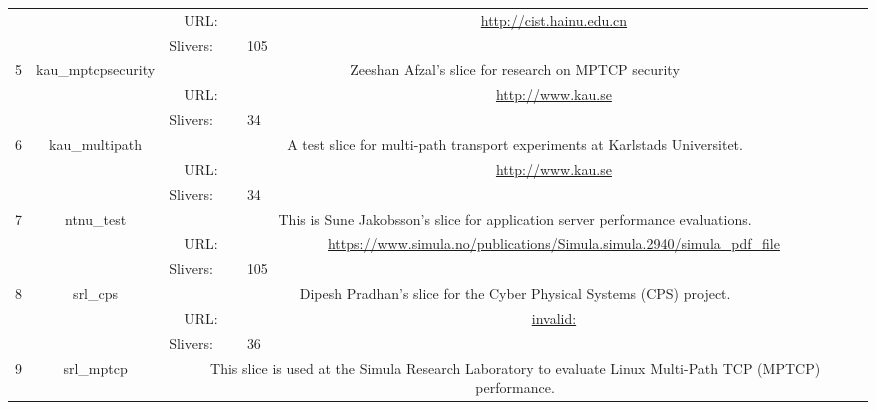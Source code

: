 \begin{small}
\begin{center}
\begin{longtable}{|c|c|c|c|}
  &  & \multicolumn{1}{|p{5em}|}{URL:} & \multicolumn{1}{|p{22.5em}|}{\url{http://cist.hainu.edu.cn}} \\* \cline{3-3}\cline{4-4}
  &  & \multicolumn{1}{|l|}{Slivers:} & \multicolumn{1}{|l|}{105} \\ \hline
 \multirow{3}{*}{5} & \multirow{3}{*}{\index{kau\_mptcpsecurity}\index{Slice!kau\_mptcpsecurity}kau\_mptcpsecurity} & \multicolumn{2}{|p{30em}|}{Zeeshan Afzal's slice for research on MPTCP security} \\* \cline{3-3}\cline{4-4}
  &  & \multicolumn{1}{|p{5em}|}{URL:} & \multicolumn{1}{|p{22.5em}|}{\url{http://www.kau.se}} \\* \cline{3-3}\cline{4-4}
  &  & \multicolumn{1}{|l|}{Slivers:} & \multicolumn{1}{|l|}{34} \\ \hline
 \multirow{3}{*}{6} & \multirow{3}{*}{\index{kau\_multipath}\index{Slice!kau\_multipath}kau\_multipath} & \multicolumn{2}{|p{30em}|}{A test slice for multi-path transport experiments at Karlstads Universitet.} \\* \cline{3-3}\cline{4-4}
  &  & \multicolumn{1}{|p{5em}|}{URL:} & \multicolumn{1}{|p{22.5em}|}{\url{http://www.kau.se}} \\* \cline{3-3}\cline{4-4}
  &  & \multicolumn{1}{|l|}{Slivers:} & \multicolumn{1}{|l|}{34} \\ \hline
 \multirow{3}{*}{7} & \multirow{3}{*}{\index{ntnu\_test}\index{Slice!ntnu\_test}ntnu\_test} & \multicolumn{2}{|p{30em}|}{This is Sune Jakobsson's slice for application server performance evaluations.} \\* \cline{3-3}\cline{4-4}
  &  & \multicolumn{1}{|p{5em}|}{URL:} & \multicolumn{1}{|p{22.5em}|}{\url{https://www.simula.no/publications/Simula.simula.2940/simula_pdf_file}} \\* \cline{3-3}\cline{4-4}
  &  & \multicolumn{1}{|l|}{Slivers:} & \multicolumn{1}{|l|}{105} \\ \hline
 \multirow{3}{*}{8} & \multirow{3}{*}{\index{srl\_cps}\index{Slice!srl\_cps}srl\_cps} & \multicolumn{2}{|p{30em}|}{Dipesh Pradhan's slice for the Cyber Physical Systems (CPS) project.} \\* \cline{3-3}\cline{4-4}
  &  & \multicolumn{1}{|p{5em}|}{URL:} & \multicolumn{1}{|p{22.5em}|}{\url{invalid:}} \\* \cline{3-3}\cline{4-4}
  &  & \multicolumn{1}{|l|}{Slivers:} & \multicolumn{1}{|l|}{36} \\ \hline
 \multirow{3}{*}{9} & \multirow{3}{*}{\index{srl\_mptcp}\index{Slice!srl\_mptcp}srl\_mptcp} & \multicolumn{2}{|p{30em}|}{This slice is used at the Simula Research Laboratory to evaluate Linux Multi-Path TCP (MPTCP) performance.} \\* \cline{3-3}\cline{4-4}

\end{longtable}
\end{center}
\end{small}
